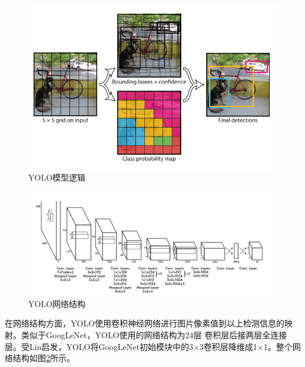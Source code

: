 \begin{figure}[t]
    \centering
    \includegraphics[scale=0.8]{pic/chap3/YOLO_model.jpg}
    \caption{YOLO模型逻辑}
    \label{fig:YOLO_model}
\end{figure}

\begin{figure} 
    \centering
    \includegraphics[scale=0.5]{pic/chap3/YOLO_construct.jpg}
    \caption{YOLO网络结构}
    \label{fig:YOLO_construct}
\end{figure}

在网络结构方面，YOLO使用卷积神经网络进行图片像素值到以上检测信息的映射。类似于GoogLeNet\cite{GoogLeNet2015}，YOLO使用的网络结构为24层
卷积层后接两层全连接层。受Lin\cite{Lin}启发，YOLO将GoogLeNet初始模块中的3×3卷积层降维成1×1。整个网络结构如图\ref{fig:YOLO_construct}所示。


